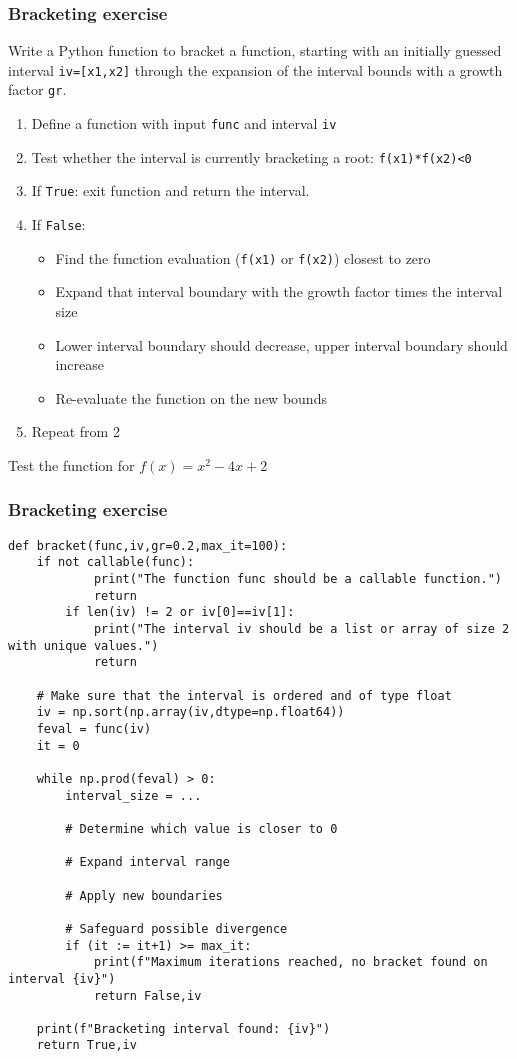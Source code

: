 \begin{frame}[fragile,label=practice_nonlin2]
  \frametitle{Bracketing exercise}
  Write a Python function to bracket a function, starting with an initially guessed interval \lstinline|iv=[x1,x2]| through the expansion of the interval bounds with a growth factor \lstinline|gr|.
    \begin{enumerate}
      \item Define a function with input \lstinline|func| and interval \lstinline|iv|
      \item Test whether the interval is currently bracketing a root: \lstinline|f(x1)*f(x2)<0|
      \item If \lstinline|True|: exit function and return the interval. 
      \item If \lstinline|False|:
        \begin{itemize}
        \item Find the function evaluation (\lstinline|f(x1)| or \lstinline|f(x2)|) closest to zero
        \item Expand that interval boundary with the growth factor times the interval size
        \item Lower interval boundary should decrease, upper interval boundary should increase
        \item Re-evaluate the function on the new bounds
        \end{itemize}
      \item Repeat from 2
    \end{enumerate}
    Test the function for \( f(x) = x^2 -4x +2 \)
\end{frame}

\begin{frame}[fragile]
  \frametitle{Bracketing exercise}
  \begin{lstlisting}[basicstyle=\tiny\ttfamily]
def bracket(func,iv,gr=0.2,max_it=100):
    if not callable(func):
            print("The function func should be a callable function.")
            return
        if len(iv) != 2 or iv[0]==iv[1]:
            print("The interval iv should be a list or array of size 2 with unique values.")
            return
    
    # Make sure that the interval is ordered and of type float
    iv = np.sort(np.array(iv,dtype=np.float64))
    feval = func(iv)
    it = 0

    while np.prod(feval) > 0:
        interval_size = ...
        
        # Determine which value is closer to 0
        
        # Expand interval range
        
        # Apply new boundaries

        # Safeguard possible divergence
        if (it := it+1) >= max_it:
            print(f"Maximum iterations reached, no bracket found on interval {iv}")
            return False,iv
 
    print(f"Bracketing interval found: {iv}")
    return True,iv
  \end{lstlisting}
\end{frame}

